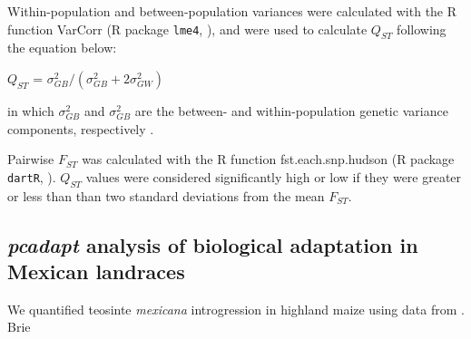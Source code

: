 \documentclass[9pt,twocolumn,twoside,lineno]{gsajnl}
\begin{document}
Within-population and between-population variances were calculated with the R function VarCorr (R package \texttt{lme4}, \citealp{bates2014lme4}), and were used to calculate $Q_{ST}$ following the equation below:

\begin{center}
$Q_{ST}$ = \(\sigma^{2}_{GB}/(\sigma^{2}_{GB}+2\sigma^{2}_{GW})\)
\end{center}

\noindent in which $\sigma^{2}_{GB}$ and $\sigma^{2}_{GB}$ are the between- and within-population genetic variance components, respectively \citep{Leinonen2013-ic}.

Pairwise $F_{ST}$ was calculated with the R function fst.each.snp.hudson (R package \texttt{dartR}, \citealp{gruber2018dartr}).
$Q_{ST}$ values were considered significantly high or low if they were greater or less than than two standard deviations from the mean $F_{ST}$.





\subsection{\textit{pcadapt} analysis of biological adaptation in Mexican landraces}

We quantified teosinte \textit{mexicana} introgression in highland maize using data from \cite{Gonzalez-Segovia2019-jy}. Brie
\end{document}
